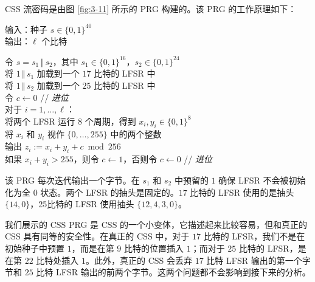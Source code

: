 \begin{snote}
CSS 流密码是由图 \ref{fig:3-11} 所示的 PRG 构建的。该 PRG 的工作原理如下：

\vspace*{10pt}

\hspace*{5pt} 输入：种子 $s\in\{0,1\}^{40}$\\
\hspace*{26pt} 输出：$\ell$ 个比特

\vspace{5pt}

\hspace*{5pt} 令 $s=s_1\,\Vert\,s_2$，其中 $s_1\in\{0,1\}^{16}$，$s_2\in\{0,1\}^{24}$\\
\hspace*{26pt} 将 $1\,\Vert\,s_1$ 加载到一个 $17$ 比特的 LFSR 中\\
\hspace*{26pt} 将 $1\,\Vert\,s_2$ 加载到一个 $25$ 比特的 LFSR 中\\
\hspace*{26pt} 令 $c\leftarrow 0$ \quad\quad // \emph{进位}\\
\hspace*{26pt} 对于 $i=1,\dots,\ell$：\\
\hspace*{50pt} 将两个 LFSR 运行 $8$ 个周期，得到 $x_i,y_i\in\{0,1\}^8$\\
\hspace*{50pt} 将 $x_i$ 和 $y_i$ 视作 $\{0,\dots,255\}$ 中的两个整数\\
\hspace*{50pt} 输出 $z_i:=x_i+y_i+c\bmod 256$\\
\hspace*{50pt} 如果 $x_i+y_i>255$，则令 $c\leftarrow1$，否则令 $c\leftarrow0$ \quad\quad // \emph{进位}

\vspace*{10pt}

该 PRG 每次迭代输出一个字节。在 $s_1$ 和 $s_2$ 中预留的 $1$ 确保 LFSR 不会被初始化为全 $0$ 状态。两个 LFSR 的抽头是固定的。$17$ 比特的 LFSR 使用的是抽头 $\{14,0\}$，25比特的 LFSR 使用抽头 $\{12,4,3,0\}$。

我们展示的 CSS PRG 是 CSS 的一个小变体，它描述起来比较容易，但和真正的 CSS 具有同等的安全性。在真正的 CSS 中，对于 $17$ 比特的 LFSR，我们不是在初始种子中预置 $1$，而是在第 $9$ 比特的位置插入 $1$；而对于 $25$ 比特的 LFSR，是在第 $22$ 比特处插入 $1$。此外，真正的 CSS 会丢弃 $17$ 比特 LFSR 输出的第一个字节和 $25$ 比特 LFSR 输出的前两个字节。这两个问题都不会影响到接下来的分析。
\end{snote}


